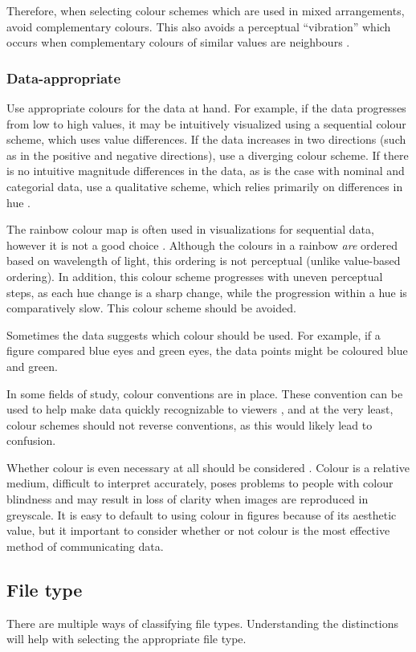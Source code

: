 \documentclass[letterpaper]{article}
\begin{document}
Therefore, when selecting colour schemes which are used in mixed arrangements, avoid complementary colours. This also avoids a perceptual ``vibration'' which occurs when complementary colours of similar values are neighbours \cite{brewers-sim}.

\subsubsection{Data-appropriate}
Use appropriate colours for the data at hand. For example, if the data progresses from low to high values, it may be intuitively visualized using a sequential colour scheme, which uses value differences. If the data increases in two directions (such as in the positive and negative directions), use a diverging colour scheme. If there is no intuitive magnitude differences in the data, as is the case with nominal and categorial data, use a qualitative scheme, which relies primarily on differences in hue \cite{brewer-colour}.

The rainbow colour map is often used in visualizations for sequential data, however it is not a good choice \cite{rainbow}. Although the colours in a rainbow \textit{are} ordered based on wavelength of light, this ordering is not perceptual (unlike value-based ordering). In addition, this colour scheme progresses with uneven perceptual steps, as each hue change is a sharp change, while the progression within a hue is comparatively slow. This colour scheme should be avoided.

Sometimes the data suggests which colour should be used. For example, if a figure compared blue eyes and green eyes, the data points might be coloured blue and green. 

In some fields of study, colour conventions are in place. These convention can be used to help make data quickly recognizable to viewers \cite{rheingans}, and at the very least, colour schemes should not reverse conventions, as this would likely lead to confusion. 

Whether colour is even necessary at all should be considered \cite{wong-avoid-colour}. Colour is a relative medium, difficult to interpret accurately, poses problems to people with colour blindness and may result in loss of clarity when images are reproduced in greyscale. It is easy to default to using colour in figures because of its aesthetic value, but it important to consider whether or not colour is the most effective method of communicating data.

\subsection{File type}
There are multiple ways of classifying file types. Understanding the distinctions will help with selecting the appropriate file type.
\end{document}
